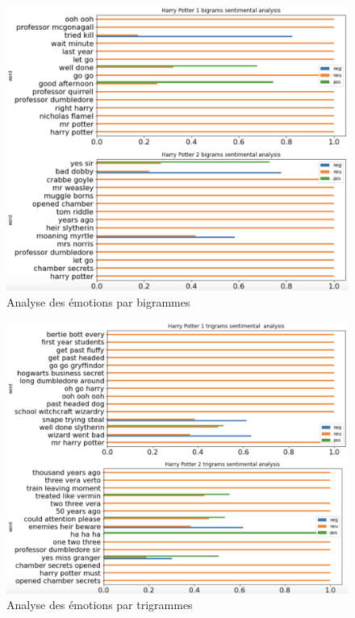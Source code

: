 \documentclass[11pt]{article}
\begin{document}
\begin{center}
\begin{figure}[hbt!]
    \centering
    \includegraphics[width= 15 cm]{./figures/Bigrams_emotions.png}
    \caption{Analyse des émotions par bigrammes}
    \label{bigramemo}
\end{figure}
\FloatBarrier
\begin{figure}[hbt!]
    \centering
    \includegraphics[width= 15 cm]{./figures/Trigrams_emotions.png}
    \caption{Analyse des émotions par trigrammes}
    \label{trigramemo}
\end{figure}
\FloatBarrier


\end{center}
\end{document}
